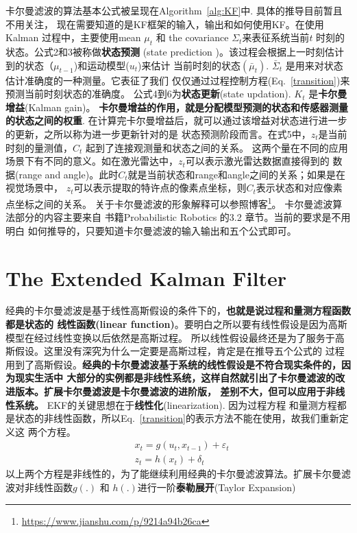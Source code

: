 \documentclass[UTF8,a4paper,10pt]{ctexart}
\begin{document}
卡尔曼滤波的算法基本公式被呈现在Algorithm~\ref{alg:KF}中. 具体的推导目前暂且不用关注，
现在需要知道的是KF框架的输入，输出和如何使用KF。在使用Kalman 过程中，主要使用mean $\mu_t$ 
和 the covariance $\Sigma_t$来表征系统当前$t$ 时刻的状态。公式2和3被称做{\bfseries 状态预测}
(state prediction )。该过程会根据上一时刻估计到的状态（$\mu_{t-1}$)和运动模型($u_{t}$)来估计
当前时刻的状态$(\bar{\mu}_t)$. $\bar{\Sigma}_t$ 是用来对状态估计准确度的一种测量。它表征了我们
仅仅通过过程控制方程(Eq.~\eqref{transition})来预测当前时刻状态的准确度。
公式4到6为{\bfseries 状态更新}(state updation). $K_t$ 是{\bfseries 卡尔曼增益}(Kalman gain)。
{\bfseries 卡尔曼增益的作用，就是分配模型预测的状态和传感器测量的状态之间的权重}. 
在计算完卡尔曼增益后，就可以通过该增益对状态进行进一步的更新，之所以称为进一步更新针对的是
状态预测阶段而言。在式5中，$z_t$是当前时刻的量测值，$C_t$ 起到了连接观测量和状态之间的关系。
这两个量在不同的应用场景下有不同的意义。如在激光雷达中，$z_t$可以表示激光雷达数据直接得到的
数据(range and angle)。此时$C_t$就是当前状态和range和angle之间的关系；如果是在视觉场景中，
$z_t$可以表示提取的特许点的像素点坐标，则$C_t$表示状态和对应像素点坐标之间的关系。
关于卡尔曼滤波的形象解释可以参照博客\footnote{\url{https://www.jianshu.com/p/9214a94b26ca}}。
卡尔曼滤波算法部分的内容主要来自 书籍Probabilistic Robotics 的3.2 章节。当前的要求是不用明白
如何推导的，只要知道卡尔曼滤波的输入输出和五个公式即可。

\section{The Extended Kalman Filter}
经典的卡尔曼滤波是基于线性高斯假设的条件下的，{\bfseries 也就是说过程和量测方程函数都是状态的
线性函数(linear function)}。要明白之所以要有线性假设是因为高斯模型在经过线性变换以后依然是高斯过程。
所以线性假设最终还是为了服务于高斯假设。这里没有深究为什么一定要是高斯过程，肯定是在推导五个公式的
过程用到了高斯假设。{\bfseries 经典的卡尔曼滤波基于系统的线性假设是不符合现实条件的，因为现实生活中
大部分的实例都是非线性系统，这样自然就引出了卡尔曼滤波的改进版本。扩展卡尔曼滤波是卡尔曼滤波的进阶版，
差别不大，但可以应用于非线性系统。} EKF的关键思想在于{\bfseries 线性化}(linearization). 因为过程方程
和量测方程都是状态的非线性函数，所以Eq.~\eqref{transition}的表示方法不能在使用，故我们重新定义这
两个方程。
\begin{align}
& x_t = g(u_t,x_{t-1})+\varepsilon_t\\
& z_t = h(x_t)+\delta_t
\label{mode}
\end{align}
以上两个方程是非线性的，为了能继续利用经典的卡尔曼滤波算法。扩展卡尔曼滤波对非线性函数$g(.)$ 和 
$h(.)$进行一阶{\bfseries 泰勒展开}(Taylor Expansion)
\end{document}
